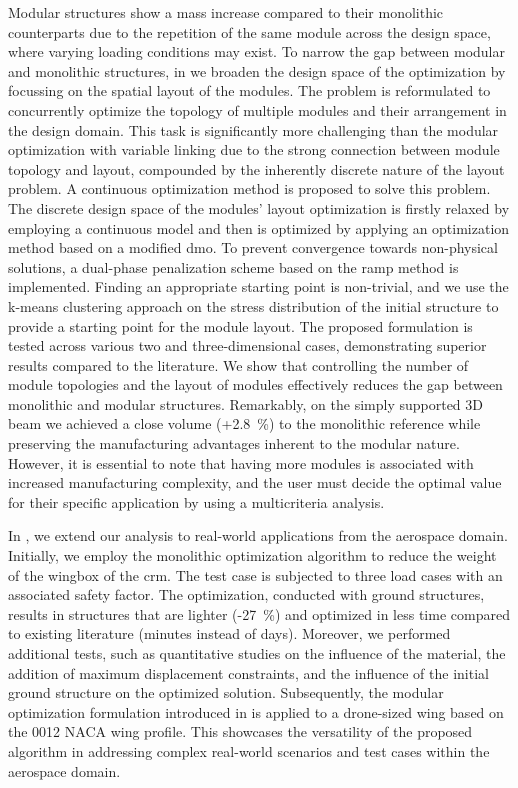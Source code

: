 Modular structures show a mass increase compared to their monolithic counterparts due to the repetition of the same module across the design space, where varying loading conditions may exist. To narrow the gap between modular and monolithic structures, in  we broaden the design space of the optimization by focussing on the spatial layout of the modules. The problem is reformulated to concurrently optimize the topology of multiple modules and their arrangement in the design domain. This task is significantly more challenging than the modular optimization with variable linking due to the strong connection between module topology and layout, compounded by the inherently discrete nature of the layout problem. A continuous optimization method is proposed to solve this problem. The discrete design space of the modules' layout optimization is firstly relaxed by employing a continuous model and then is optimized by applying an optimization method based on a modified \gls{dmo}. To prevent convergence towards non-physical solutions, a dual-phase penalization scheme based on the \gls{ramp} method is implemented. Finding an appropriate starting point is non-trivial, and we use the k-means clustering approach on the stress distribution of the initial structure to provide a starting point for the module layout. The proposed formulation is tested across various two and three-dimensional cases, demonstrating superior results compared to the literature. We show that controlling the number of module topologies and the layout of modules effectively reduces the gap between monolithic and modular structures. Remarkably, on the simply supported 3D beam we achieved a close volume (+\qty{2.8}{\percent}) to the monolithic reference while preserving the manufacturing advantages inherent to the modular nature. However, it is essential to note that having more modules is associated with increased manufacturing complexity, and the user must decide the optimal value for their specific application by using a multicriteria analysis.

In , we extend our analysis to real-world applications from the aerospace domain. Initially, we employ the monolithic optimization algorithm to reduce the weight of the wingbox of the \gls{crm}. The test case is subjected to three load cases with an associated safety factor. The optimization, conducted with ground structures, results in structures that are lighter (-\qty{27}{\%}) and optimized in less time compared to existing literature (minutes instead of days). Moreover, we performed additional tests, such as quantitative studies on the influence of the material, the addition of maximum displacement constraints, and the influence of the initial ground structure on the optimized solution. Subsequently, the modular optimization formulation introduced in  is applied to a drone-sized wing based on the 0012 NACA wing profile. This showcases the versatility of the proposed algorithm in addressing complex real-world scenarios and test cases within the aerospace domain.

